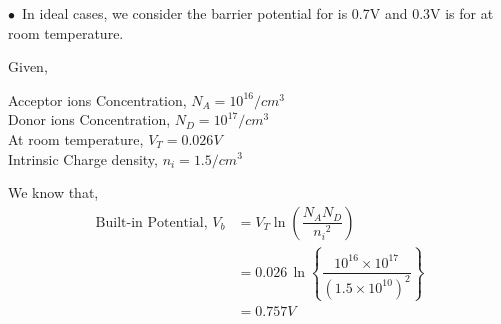 \documentclass[a4aper,12pt]{report}
\begin{document}
$\bullet\,\,\, $In ideal cases, we consider the barrier potential for  is 0.7V and 0.3V is for  at room temperature.
\begin{tcolorbox}[breakable, title = {\textbf{Example 1.2: }Consider a pn junction at room temperature, doped ar $N_A=10^{16}/cm^3$ in the p-region and $N_D=10^{17}/cm^3$ in the n-region. Intrinsic carrier density is $1.5/cm^3$ at room temperature. Calculate the built-in potential. }]
    Given,
    \begin{adjustwidth}{1cm}{5pt}
        Acceptor ions Concentration, $N_A =10^{16}/cm^3$ \\
        Donor ions Concentration, $N_D=10^{17}/cm^3$ \\
        At room temperature, $V_T = 0.026 V$ \\ 
        Intrinsic Charge density, $n_i = 1.5/cm^3$
    \end{adjustwidth}
    We know that,
    \begin{align*}
        \text{Built-in Potential, }V_b &= V_T\ln\left(\dfrac{N_AN_D}{{n_i}^2}\right) \\ 
        &=0.026\, \ln\left\{\dfrac{10^{16}\times 10^{17}}{(1.5\times 10^{10})^2}\right\} \\ 
        &= 0.757 V
    \end{align*}
\end{tcolorbox}
\end{document}

